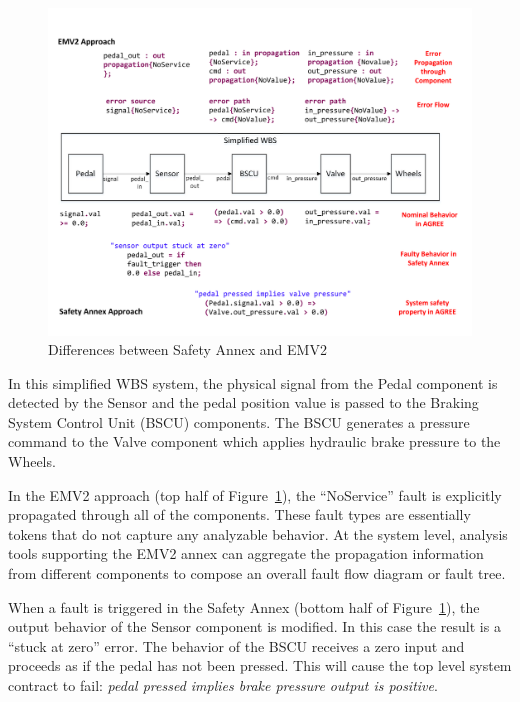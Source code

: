 \begin{figure}[t]
	\vspace{-0.19in}
	\centering
	\includegraphics[trim=0 9 0 5,clip,width=\textwidth]{images/Comparison_with_EMV2.pdf}
	\vspace{-0.3in}
	\caption{Differences between Safety Annex and EMV2}
	\label{fig:comparison_with_EMV2}
	\vspace{-0.2in}
\end{figure} 

In this simplified WBS system, the physical signal from the Pedal component is detected by the Sensor and the pedal position value is passed to the Braking System Control Unit (BSCU) components.  The BSCU generates a pressure command to the Valve component which applies hydraulic brake pressure to the Wheels. 

In the EMV2 approach (top half of Figure~\ref{fig:comparison_with_EMV2}), the ``NoService'' fault is explicitly propagated through all of the components. These fault types are essentially tokens that do not capture any analyzable behavior. At the system level, analysis tools supporting the EMV2 annex can aggregate the propagation information from different components to compose an overall fault flow diagram or fault tree. 

When a fault is triggered in the Safety Annex (bottom half of Figure~\ref{fig:comparison_with_EMV2}), the output behavior of the Sensor component is modified. In this case the result is a ``stuck at zero'' error. The behavior of the BSCU receives a zero input and proceeds as if the pedal has not been pressed. This will cause the top level system contract to fail: {\em pedal pressed implies brake pressure output is positive}.

